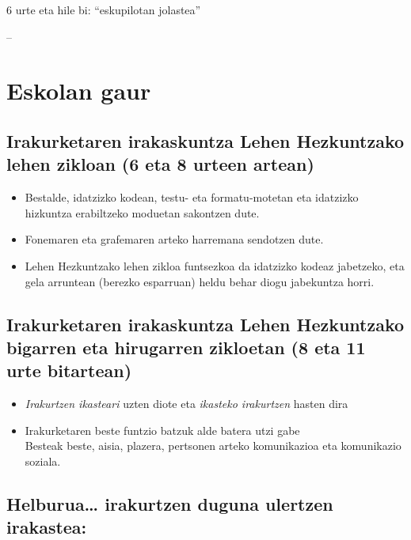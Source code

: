 \documentclass[
]{book}
\providecommand{\tightlist}{%
  \setlength{\itemsep}{0pt}\setlength{\parskip}{0pt}}
\begin{document}
6 urte eta hile bi: ``eskupilotan jolastea''

--

\hypertarget{eskolan-gaur}{%
\section{Eskolan gaur}\label{eskolan-gaur}}

\hypertarget{irakurketaren-irakaskuntza-lehen-hezkuntzako-lehen-zikloan-6-eta-8-urteen-artean}{%
\subsection{Irakurketaren irakaskuntza Lehen Hezkuntzako lehen zikloan (6 eta 8 urteen artean)}\label{irakurketaren-irakaskuntza-lehen-hezkuntzako-lehen-zikloan-6-eta-8-urteen-artean}}

\begin{itemize}
\tightlist
\item
  Bestalde, idatzizko kodean, testu- eta formatu-motetan eta idatzizko hizkuntza erabiltzeko moduetan sakontzen dute.
\item
  Fonemaren eta grafemaren arteko harremana sendotzen dute.
\item
  Lehen Hezkuntzako lehen zikloa funtsezkoa da idatzizko kodeaz jabetzeko, eta gela arruntean (berezko esparruan) heldu behar diogu jabekuntza horri.
\end{itemize}

\hypertarget{irakurketaren-irakaskuntza-lehen-hezkuntzako-bigarren-eta-hirugarren-zikloetan-8-eta-11-urte-bitartean}{%
\subsection{Irakurketaren irakaskuntza Lehen Hezkuntzako bigarren eta hirugarren zikloetan (8 eta 11 urte bitartean)}\label{irakurketaren-irakaskuntza-lehen-hezkuntzako-bigarren-eta-hirugarren-zikloetan-8-eta-11-urte-bitartean}}

\begin{itemize}
\tightlist
\item
  \emph{Irakurtzen ikasteari} uzten diote eta \emph{ikasteko irakurtzen} hasten dira
\item
  Irakurketaren beste funtzio batzuk alde batera utzi gabe\\
  Besteak beste, aisia, plazera, pertsonen arteko komunikazioa eta komunikazio soziala.
\end{itemize}

\hypertarget{helburua-irakurtzen-duguna-ulertzen-irakastea}{%
\subsection{Helburua\ldots{} irakurtzen duguna ulertzen irakastea:}\label{helburua-irakurtzen-duguna-ulertzen-irakastea}}
\end{document}
